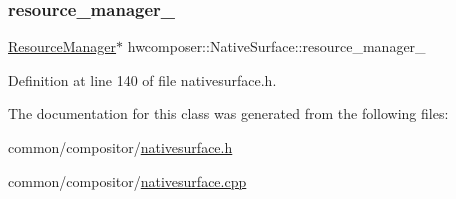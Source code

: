 \subsubsection{\texorpdfstring{resource\+\_\+manager\+\_\+}{resource\_manager\_}}
{\footnotesize\ttfamily \mbox{\hyperlink{classhwcomposer_1_1ResourceManager}{Resource\+Manager}}$\ast$ hwcomposer\+::\+Native\+Surface\+::resource\+\_\+manager\+\_\+\hspace{0.3cm}{\ttfamily [protected]}}



Definition at line 140 of file nativesurface.\+h.



The documentation for this class was generated from the following files\+:\begin{DoxyCompactItemize}
\item 
common/compositor/\mbox{\hyperlink{nativesurface_8h}{nativesurface.\+h}}\item 
common/compositor/\mbox{\hyperlink{nativesurface_8cpp}{nativesurface.\+cpp}}\end{DoxyCompactItemize}
